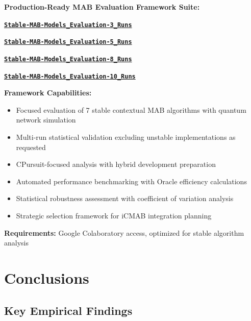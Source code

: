 \documentclass[12pt,a4paper]{article}
\newcommand{\colab}[1]{\textcolor{colabcolor}{\textbf{#1}}}
\begin{document}
\begin{tcolorbox}[colback=colabcolor!20,colframe=colabcolor,title=\textbf{Stable Algorithm Evaluation Framework Access}]

\begin{center}
\textbf{Production-Ready MAB Evaluation Framework Suite:}
\vspace{0.3cm}

\href{https://colab.research.google.com/drive/MAB-Stable-Models-3-Runs}{\colab{\texttt{Stable-MAB-Models\_Evaluation-3\_Runs}}}

\href{https://colab.research.google.com/drive/MAB-Stable-Models-5-Runs}{\colab{\texttt{Stable-MAB-Models\_Evaluation-5\_Runs}}}

\href{https://colab.research.google.com/drive/MAB-Stable-Models-8-Runs}{\colab{\texttt{Stable-MAB-Models\_Evaluation-8\_Runs}}}

\href{https://colab.research.google.com/drive/MAB-Stable-Models-10-Runs}{\colab{\texttt{Stable-MAB-Models\_Evaluation-10\_Runs}}}

\vspace{0.3cm}
\textbf{Framework Capabilities:}
\begin{itemize}
\item Focused evaluation of 7 stable contextual MAB algorithms with quantum network simulation
\item Multi-run statistical validation excluding unstable implementations as requested
\item CPursuit-focused analysis with hybrid development preparation
\item Automated performance benchmarking with Oracle efficiency calculations
\item Statistical robustness assessment with coefficient of variation analysis
\item Strategic selection framework for iCMAB integration planning
\end{itemize}

\textbf{Requirements:} Google Colaboratory access, optimized for stable algorithm analysis
\end{center}
\end{tcolorbox}

\section{Conclusions}

\subsection{Key Empirical Findings}
\end{document}
